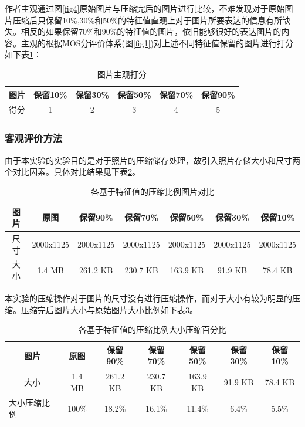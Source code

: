 \documentclass{hfutpaper}
\begin{document}
作者主观通过图\ref{fig4}原始图片与压缩完后的图片进行比较，不难发现对于原始图片压缩后只保留10\%,30\%和50\%的特征值直观上对于图片所要表达的信息有所缺失。相反的如果保留70\%和90\%的特征值的图片，依旧能够很好的表达图片的内容。主观的根据MOS分评价体系(图\ref{fig1})对上述不同特征值保留的图片进行打分如下表\ref{tab1}：
\begin{table}[h]
	\centering
	\begin{tabular}{|l|l|l|l|l|l|}
		\hline
		图片 & 保留10\%                 & 保留30\%                 & 保留50\%                 & 保留70\%                 & 保留90\%                 \\ \hline
		得分 & \multicolumn{1}{c|}{1} & \multicolumn{1}{c|}{2} & \multicolumn{1}{c|}{3} & \multicolumn{1}{c|}{4} & \multicolumn{1}{c|}{5} \\ \hline
	\end{tabular}
	\caption{图片主观打分}
	\label{tab1}
\end{table}

\subsubsection{客观评价方法}
由于本实验的实验目的是对于照片的压缩储存处理，故引入照片存储大小和尺寸两个对比因素。具体对比结果见下表\ref{tab2}。
\begin{table}[h]
	\centering
	\begin{tabular}{|c|c|c|c|c|c|c|}
		\hline
		图片 & 原图        & 保留90\%    & 保留70\%    & 保留50\%    & 保留30\%    & 保留10\%    \\ \hline
		尺寸 & 2000x1125 & 2000x1125 & 2000x1125 & 2000x1125 & 2000x1125 & 2000x1125 \\ \hline
		大小 & 1.4 MB    & 261.2 KB  & 230.7 KB  & 163.9 KB  & 91.9 KB   & 78.4 KB   \\ \hline
	\end{tabular}
	\caption{各基于特征值的压缩比例图片对比}
	\label{tab2}
\end{table}

本实验的压缩操作对于图片的尺寸没有进行压缩操作，而对于大小有较为明显的压缩。压缩完后图片大小与原始图片大小比例如下表\ref{tab3}。
\begin{table}[]
	\centering
	\begin{tabular}{|c|c|c|c|c|c|c|}
		\hline
		图片                         & 原图     & 保留90\%   & 保留70\%   & 保留50\%   & 保留30\%  & 保留10\%  \\ \hline
		大小                         & 1.4 MB & 261.2 KB & 230.7 KB & 163.9 KB & 91.9 KB & 78.4 KB \\ \hline
		\multicolumn{1}{|l|}{大小压缩比例} & 100\%  & 18.2\%   & 16.1\%   & 11.4\%   & 6.4\%   & 5.5\%   \\ \hline
	\end{tabular}
	\caption{各基于特征值的压缩比例大小压缩百分比}
	\label{tab3}
\end{table}
\end{document}
